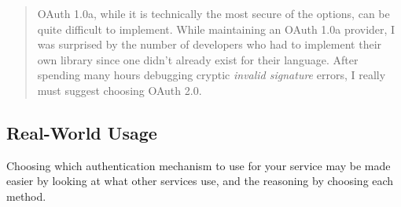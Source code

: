 \documentclass{book}
\begin{document}
\begin{quote}
OAuth 1.0a, while it is technically the most secure of the options, can be quite difficult to implement. While maintaining an OAuth 1.0a provider, I was surprised by the number of developers who had to implement their own library since one didn't already exist for their language. After spending many hours debugging cryptic \emph{invalid signature} errors, I really must suggest choosing OAuth 2.0.
\end{quote}

\subsection{Real-World Usage}

Choosing which authentication mechanism to use for your service may be made easier by looking at what other services use, and the reasoning by choosing each method.
\end{document}
